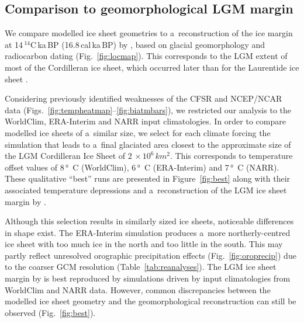 \documentclass[tc, ms]{copernicus}
\begin{document}
\subsection{Comparison to geomorphological LGM margin}

We compare modelled ice sheet geometries to a~reconstruction of the ice margin at 14\,$^{14}$C\,ka\,BP (16.8\,cal\,ka\,BP) by \citet{dyke-2004}, based on glacial geomorphology and radiocarbon dating (Fig.~\ref{fig:locmap}). This corresponds to the LGM extent of most of the Cordilleran ice sheet, which occurred later than for the Laurentide ice sheet \citep{porter-swanson-1998,dyke-2004,stroeven-etal-2010,stroeven-etal-inpress}.

Considering previously identified weaknesses of the CFSR and NCEP/NCAR data (Figs.~\ref{fig:tempheatmap}--\ref{fig:biatmbars}), we restricted our analysis to the WorldClim, ERA-Interim and NARR input climatologies. In order to compare modelled ice sheets of a~similar size, we select for each climate forcing the simulation that leads to a~final glaciated area closest to the approximate size of the LGM Cordilleran Ice Sheet of $2\,\times10^6\,\unit{km^2}$. This corresponds to temperature offset values of 8\,\unit{\degree C} (WorldClim), 6\,\unit{\degree C} (ERA-Interim) and 7\,\unit{\degree C} (NARR). These qualitative “best” runs are presented in Figure~\ref{fig:best} along with their associated temperature depressions and a~reconstruction of the LGM ice sheet margin by \citet{dyke-2004}.

Although this selection results in similarly sized ice sheets, noticeable differences in shape exist. The ERA-Interim simulation produces a~more northerly-centred ice sheet with too much ice in the north and too little in the south. This may partly reflect unresolved orographic precipitation effects (Fig.~\ref{fig:oroprecip}) due to the coarser GCM resolution (Table~\ref{tab:reanalyses}). The LGM ice sheet margin by \citet{dyke-2004} is best reproduced by simulations driven by input climatologies from WorldClim and NARR data. However, common discrepancies between the modelled ice sheet geometry and the geomorphological reconstruction can still be observed (Fig.~\ref{fig:best}).
\end{document}
